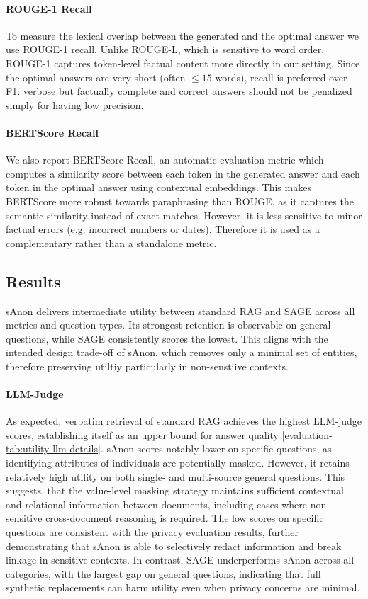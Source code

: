 \paragraph{ROUGE-1 Recall} To measure the lexical overlap between the generated and the optimal answer we use ROUGE-1 recall. Unlike ROUGE-L, which is sensitive to word order, ROUGE-1 captures token-level factual content more directly in our setting. Since the optimal answers are very short (often $\leq 15$ words), recall is preferred over F1: verbose but factually complete and correct answers should not be penalized simply for having low precision.

\paragraph{BERTScore Recall} We also report BERTScore Recall\cite{bertScore}, an automatic evaluation metric which computes a similarity score between each token in the generated answer and each token in the optimal answer using contextual embeddings. This makes BERTScore more robust towards paraphrasing than ROUGE, as it captures the semantic similarity instead of exact matches. However, it is less sensitive to minor factual errors (e.g. incorrect numbers or dates). Therefore it is used as a complementary rather than a standalone metric.


\subsection{Results}
sAnon delivers intermediate utility between standard RAG and SAGE across all metrics and question types. Its strongest retention is observable on general questions, while SAGE consistently scores the lowest. This aligns with the intended design trade-off of sAnon, which removes only a minimal set of entities, therefore preserving utiltiy particularly in non-senstiive contexts. 

\paragraph{LLM-Judge}
As expected, verbatim retrieval of standard RAG achieves the highest LLM-judge scores, establishing itself as an upper bound for answer quality \ref{evaluation-tab:utility-llm-details}. sAnon scores notably lower on specific questions, as identifying attributes of individuals are potentially masked. However, it retains relatively high utility on both single- and multi-source general questions. 
This suggests, that the value-level masking strategy maintains sufficient contextual and relational information between documents, including cases where non-sensitive cross-document reasoning is required. The low scores on specific questions are consistent with the privacy evaluation results, further demonstrating that sAnon is able to selectively redact information and break linkage in sensitive contexts.
In contrast, SAGE underperforms sAnon across all categories, with the largest gap on general questions, indicating that full synthetic replacements can harm utility even when privacy concerns are minimal.


